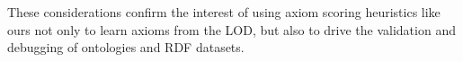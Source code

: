 \documentclass{sig-alternate}
\begin{document}



These considerations confirm the interest of using axiom scoring heuristics like ours
not only to learn axioms from the LOD, but also to drive the validation and debugging of ontologies and RDF datasets.



%
%
\end{document}
